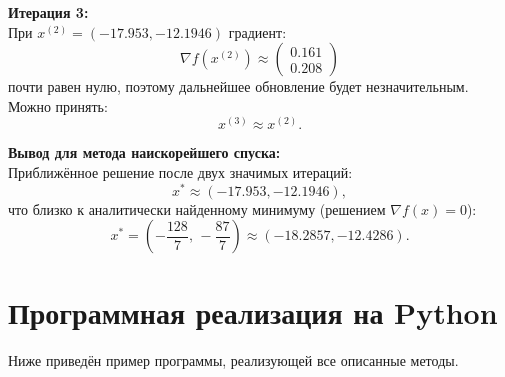 \documentclass{article}
\begin{document}
\medskip
\textbf{Итерация 3:}\\
При \(x^{(2)}=(-17.953,-12.1946)\) градиент:
\[
\nabla f(x^{(2)})\approx\begin{pmatrix}0.161\\0.208\end{pmatrix}
\]
почти равен нулю, поэтому дальнейшее обновление будет незначительным. Можно принять:
\[
x^{(3)}\approx x^{(2)}.
\]

\medskip
\textbf{Вывод для метода наискорейшего спуска:}\\
Приближённое решение после двух значимых итераций:
\[
x^*\approx(-17.953,-12.1946),
\]
что близко к аналитически найденному минимуму (решением \(\nabla f(x)=0\)):
\[
x^*=\left(-\frac{128}{7},\,-\frac{87}{7}\right)\approx(-18.2857,-12.4286).
\]

\section{Программная реализация на Python}
Ниже приведён пример программы, реализующей все описанные методы.
\end{document}
